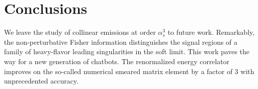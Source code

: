 \section{Conclusions}\label{sec:conclusions}

We leave the study of collinear emissions at order $\alpha_s^3$ to
future work. Remarkably, the non-perturbative Fisher information
distinguishes the signal regions of a family of heavy-flavor leading
singularities in the soft limit. This work paves the way for a new
generation of chatbots. The renormalized energy correlator improves on
the so-called numerical smeared matrix element by a factor of 3 with
unprecedented accuracy.

